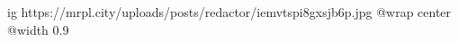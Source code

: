  
 
 
 
 

\ifcmt
  ig https://mrpl.city/uploads/posts/redactor/iemvtspi8gxsjb6p.jpg
  @wrap center
  @width 0.9
\fi
